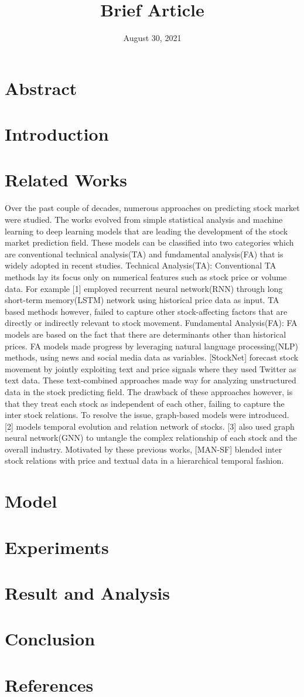 \documentclass[11pt, oneside, twocolumn]{article}   	%
\title{Brief Article}
\author{}
\date{August 30, 2021}							%
\begin{document}
\maketitle

\section{Abstract}
\section{Introduction}
\section{Related Works}
Over the past couple of decades, numerous approaches on predicting stock market were studied. The works evolved from simple statistical analysis and machine learning to deep learning models that are leading the development of the stock market prediction field. These models can be classified into two categories which are conventional technical analysis(TA) and fundamental analysis(FA) that is widely adopted in recent studies.
Technical Analysis(TA): Conventional TA methods lay its focus only on numerical features such as stock price or volume data. For example [1] employed recurrent neural network(RNN) through long short-term memory(LSTM) network using historical price data as input. TA based methods however, failed to capture other stock-affecting factors that are directly or indirectly relevant to stock movement.
Fundamental Analysis(FA): FA models are based on the fact that there are determinants other than historical prices. FA models made progress by leveraging natural language processing(NLP) methods, using news and social media data as variables. [StockNet] forecast stock movement by jointly exploiting text and price signals where they used Twitter as text data. These text-combined approaches made way for analyzing unstructured data in the stock predicting field. The drawback of these approaches however, is that they treat each stock as independent of each other, failing to capture the inter stock relations. To resolve the issue, graph-based models were introduced. [2] models temporal evolution and relation network of stocks. [3] also used graph neural network(GNN) to untangle the complex relationship of each stock and the overall industry. Motivated by these previous works, [MAN-SF] blended inter stock relations with price and textual data in a hierarchical temporal fashion.
\section{Model}
\section{Experiments}
\section{Result and Analysis}
\section{Conclusion}
\section{References}
\end{document}
